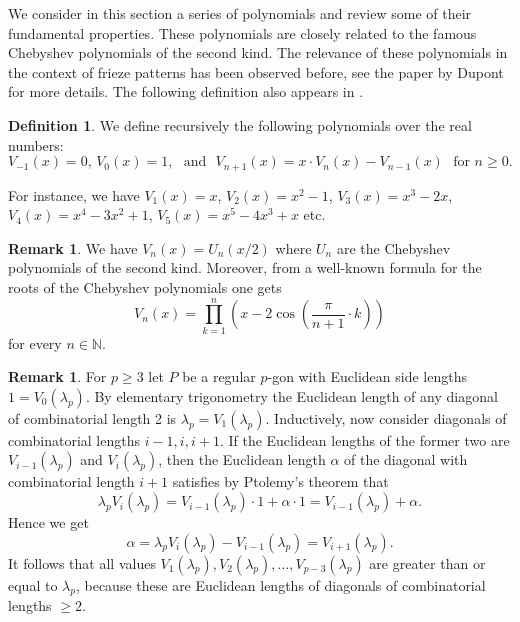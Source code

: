 \documentclass[11pt,a4paper]{amsart}
\theoremstyle{definition}
\newtheorem{Definition}[Lemma]{Definition}
\newtheorem{Remark}[Lemma]{Remark}
\numberwithin{equation}{section}
\begin{document}
We consider in this section a series of polynomials and review some of their fundamental properties. 
These polynomials are closely related to the famous Chebyshev polynomials of the second kind. 
The relevance of these polynomials in the context of frieze patterns has been observed before, see 
the paper by Dupont \cite{Dup12} for more details. The following definition also appears in 
\cite[Definition 6]{BC21}. 


\begin{Definition} \label{def:chebyshev}
We define recursively the following polynomials over the real numbers:
$$V_{-1}(x)=0,\,V_0(x)=1,\mbox{~~and~~}
V_{n+1}(x) = x\cdot V_n(x) - V_{n-1}(x)\mbox{~~for $n\ge 0$}.
$$
\end{Definition}

For instance, we have $V_1(x)=x$, $V_2(x)=x^2-1$, $V_3(x)=x^3-2x$, $V_4(x)=x^4-3x^2+1$,
$V_5(x)= x^5-4x^3+x$ etc. 



\begin{Remark} \label{rem:roots}
We have $V_n(x) = U_n(x/2)$ where $U_n$ are the Chebyshev polynomials of the second kind.
Moreover, from a well-known formula for the roots of the Chebyshev polynomials one gets
$$V_n(x) = \prod_{k=1}^n \left(x-2\cos\left(\frac{\pi}{n+1}\cdot k\right)\right)
$$
for every $n\in \mathbb{N}$. 
\end{Remark}


\begin{Remark} \label{rem:Euclidlength}
For $p\ge 3$ let $P$ be a regular $p$-gon with Euclidean side lengths $1=V_0(\lambda_p)$. 
By elementary trigonometry the Euclidean length of any diagonal of combinatorial length 2 is 
$\lambda_p=V_1(\lambda_p)$. Inductively, now consider diagonals of combinatorial lengths 
$i-1,i,i+1$. If the Euclidean lengths of the former two are $V_{i-1}(\lambda_p)$ and $V_i(\lambda_p)$,
then the Euclidean length $\alpha$ of the diagonal with combinatorial length $i+1$ satisfies by Ptolemy's theorem that 
$$\lambda_p V_i(\lambda_p) = V_{i-1}(\lambda_p) \cdot 1 + \alpha\cdot 1 =
 V_{i-1}(\lambda_p) + \alpha.
 $$
 Hence we get
 $$\alpha = \lambda_p V_i(\lambda_p) - V_{i-1}(\lambda_p) = V_{i+1}(\lambda_p).
 $$
 It follows that all values $V_1(\lambda_p),V_2(\lambda_p),\ldots,V_{p-3}(\lambda_p)$ are
 greater than or equal to $\lambda_p$, because these are Euclidean lengths of diagonals of
 combinatorial lengths $\ge 2$. 
\end{Remark}
\end{document}
